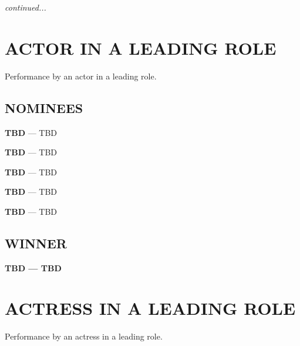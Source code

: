 \documentclass[letterpaper]{extarticle}
\begin{document}
  \mbox{}
  \vfill
  \textit{continued...}

  \newpage

  \section*{\textcolor{oscaryellow}{{\selectfont ACTOR IN A LEADING ROLE}}}
  \vspace{-6pt}
  {\selectfont Performance by an actor in a leading role.}
  \subsection*{{\selectfont NOMINEES}}
  \begin{multicols}{2}
    \begin{itemize}
      \begin{small}
        \item \textbf{{\selectfont TBD}} — TBD
        \item \textbf{{\selectfont TBD}} — TBD
        \item \textbf{{\selectfont TBD}} — TBD
        \item \textbf{{\selectfont TBD}} — TBD
        \item \textbf{{\selectfont TBD}} — TBD
      \end{small}
    \end{itemize}
  \end{multicols}

  \subsection*{{\selectfont WINNER}}
  \textcolor{oscaryellow}{\textbf{{\selectfont TBD} — TBD}}

  \section*{\textcolor{oscaryellow}{{\selectfont ACTRESS IN A LEADING ROLE}}}
  \vspace{-6pt}
  {\selectfont Performance by an actress in a leading role.}
\end{document}

